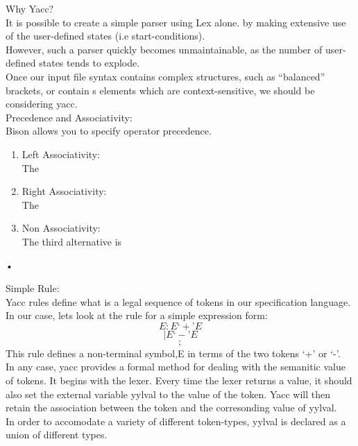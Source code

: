 \documentclass[11pt]{article}
\begin{document}
	\noindent
	Why Yacc?\\
	It is possible to create a simple parser using Lex alone. by making extensive use of the user-defined states (i.e start-conditions).\\ However, such a parser quickly becomes unmaintainable, as the number of user-defined states tends to explode.\\
	Once our input file syntax contains complex structures, such as “balanced” brackets, or contain s elements which are context-sensitive, we should be considering yacc.\\
	
	\noindent
	Precedence and Associativity:\\
	Bison allows you to specify operator precedence.
	\begin{enumerate}
		\item Left Associativity:\\
		The %
		\item Right Associativity:\\
		The %
		\item Non Associativity:\\
		The third alternative is %
	\end{enumerate}•
	
	\noindent
	Simple Rule:\\
	Yacc rules define what is a legal sequence of tokens in our specification language. In our case, lets look at the rule for a simple expression form:\\
	$$E : E‘+’E$$
	$$| E‘-’E$$
	$$;$$
	This rule defines a non-terminal symbol,E in terms of the two tokens ‘+’ or ‘-’.\\
	In any case, yacc provides a formal method for dealing with the semanitic value of tokens. It begins with the lexer. Every time the lexer returns a value, it should also set the external variable yylval to the value of the token. Yacc will then retain the association between the token and the corresonding value of yylval.\\
	In order to accomodate a variety of different token-types, yylval is declared as a union of different types.\\
	
\end{document}

